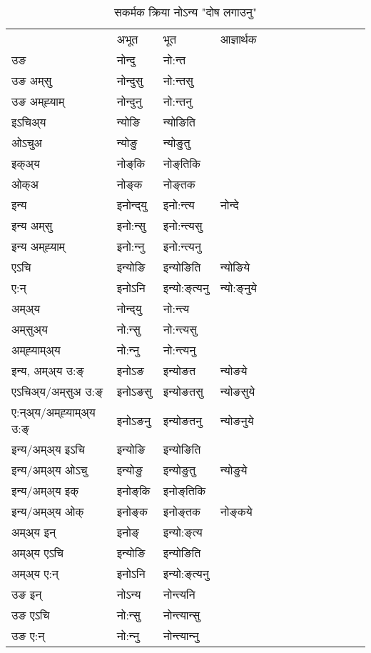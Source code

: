\begin{table}[H]
\centering
\caption{\label{oŋt.vt} सकर्मक क्रिया  नोऽन्य  "दोष लगाउनु"  }
\begin{tabular}{l|l|l|l|l|l|l|l|l|l|l|l|l}  \toprule
&अभूत & भूत & आज्ञार्थक \\ 
उङ &नोन्दु &नो:न्त \\ 
उङ अम्‌सु&नोन्दुसु &नो:न्तसु \\ 
उङ अम्‌ह्‍याम्&नोन्दुनु &नो:न्तनु \\ 
इऽचिअ्य &न्योङि &न्योङिति   \\ 
ओऽचुअ        &न्योङु &न्योङुतु   \\ 
इक्अ्य&नोङ्‌कि &नोङ्‌तिकि   \\ 
ओक्अ &नोङ्‌क &नोङ्‌तक   \\ 
इन्य & इनोन्द्‌यु  & इनो:न्त्य &नोन्दे  \\ 
इन्य अम्‌सु& इनो:न्सु  & इनो:न्त्यसु   \\ 
इन्य अम्‌ह्‍याम्& इनो:न्‍नु  & इनो:न्त्यनु   \\ 
एऽचि & इन्योङि & इन्योङिति &न्योङिये    \\ 
ए:न् & इनोऽनि  & इन्यो:ङ्‌त्यनु &न्यो:ङ्‌नुये  \\ 
अम्अ्य & नोन्द्‌यु  & नो:न्त्य  \\ 
अम्‌सुअ्य & नो:न्सु & नो:न्त्यसु  \\ 
अम्‌ह्‍याम्अ्य & नो:न्‍नु  & नो:न्त्यनु \\ 
\midrule
इन्य, अम्अ्य उ:ङ्‌ &इनोऽङ &इन्योङत &न्योङये \\ 
एऽचिअ्य/अम्‌सुअ उ:ङ्‌ &इनोऽङसु &इन्योङतसु &न्योङसुये \\ 
ए:न्अ्य/अम्‌ह्‍याम्अ्य उ:ङ्‌ &इनोऽङनु &इन्योङतनु &न्योङनुये \\ 
इन्य/अम्अ्य इऽचि &इन्योङि &इन्योङिति    \\ 
इन्य/अम्अ्य ओऽचु &इन्योङु &इन्योङुतु  &न्योङुये  \\ 
इन्य/अम्अ्य इक् &इनोङ्‌कि &इनोङ्‌तिकि   \\ 
इन्य/अम्अ्य ओक् &इनोङ्‌क &इनोङ्‌तक  &नोङ्‌कये  \\ 
अम्अ्य इन् & इनोङ्‌ & इन्यो:ङ्‌त्य   \\ 
अम्अ्य एऽचि & इन्योङि & इन्योङिति    \\ 
अम्अ्य ए:न् & इनोऽनि  & इन्यो:ङ्‌त्यनु  \\ 
\midrule
उङ इन् & नोऽन्य  & नोन्त्यनि  \\ 
उङ एऽचि & नो:न्सु  & नोन्त्यान्सु   \\ 
उङ ए:न्& नो:न्‍नु  & नोन्त्यान्‍नु   \\ 
\bottomrule
\end{tabular}
\end{table}


